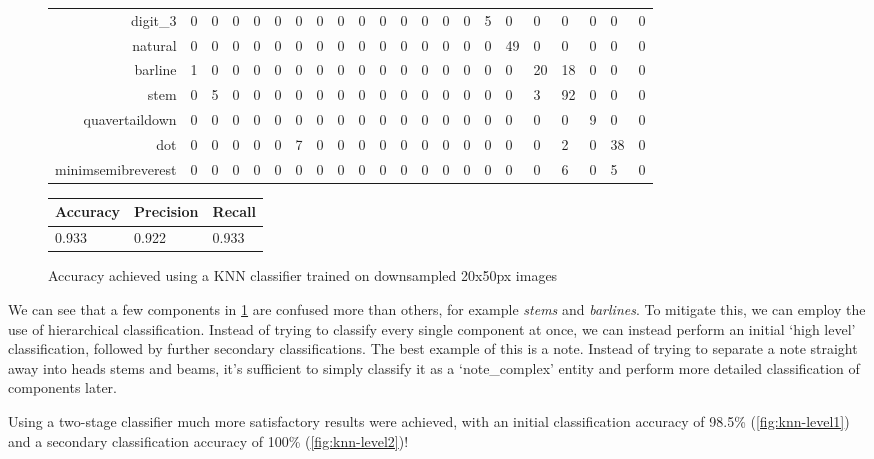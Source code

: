 \begin{figure}[H]
\begin{subtable}[b]{\linewidth}
\begin{tabularx}{\textwidth}{r|XXXXXXXXXXXXXXXXXXXXX}
    digit\_3 & 0 & 0 & 0 & 0 & 0 & 0 & 0 & 0 & 0 & 0 & 0 & 0 & 0 & 0 & 5 & 0 & 0 & 0 & 0 & 0 & 0 \\
    natural & 0 & 0 & 0 & 0 & 0 & 0 & 0 & 0 & 0 & 0 & 0 & 0 & 0 & 0 & 0 & 49 & 0 & 0 & 0 & 0 & 0 \\
    barline & 1 & 0 & 0 & 0 & 0 & 0 & 0 & 0 & 0 & 0 & 0 & 0 & 0 & 0 & 0 & 0 & 20 & 18 & 0 & 0 & 0 \\
    stem & 0 & 5 & 0 & 0 & 0 & 0 & 0 & 0 & 0 & 0 & 0 & 0 & 0 & 0 & 0 & 0 & 3 & 92 & 0 & 0 & 0 \\
    quavertaildown & 0 & 0 & 0 & 0 & 0 & 0 & 0 & 0 & 0 & 0 & 0 & 0 & 0 & 0 & 0 & 0 & 0 & 0 & 9 & 0 & 0 \\
    dot & 0 & 0 & 0 & 0 & 0 & 7 & 0 & 0 & 0 & 0 & 0 & 0 & 0 & 0 & 0 & 0 & 0 & 2 & 0 & 38 & 0 \\
    minimsemibreverest & 0 & 0 & 0 & 0 & 0 & 0 & 0 & 0 & 0 & 0 & 0 & 0 & 0 & 0 & 0 & 0 & 0 & 6 & 0 & 5 & 0 \\
    \end{tabularx}
  \end{subtable}
  \vspace{0.8cm}
  \begin{subtable}[b]{.4\linewidth}
    \begin{tabularx}{\linewidth}{lll}
      \toprule
      Accuracy & Precision & Recall \\
      \midrule
      0.933 & 0.922 & 0.933 \\
      \bottomrule
    \end{tabularx}
  \end{subtable}
  \caption{Accuracy achieved using a KNN classifier trained on downsampled 20x50px images}
  \label{table:confusion-matrix-knn-img-all}
\end{figure}

We can see that a few components in \cref{table:confusion-matrix-knn-img-all} are confused more than others, for example \emph{stems} and \emph{barlines}. To mitigate this, we can employ the use of hierarchical classification. Instead of trying to classify every single component at once, we can instead perform an initial `high level' classification, followed by further secondary classifications. The best example of this is a note. Instead of trying to separate a note straight away into heads stems and beams, it's sufficient to simply classify it as a `note\_complex' entity and perform more detailed classification of components later.

Using a two-stage classifier much more satisfactory results were achieved, with an initial classification accuracy of 98.5\% (\cref{fig:knn-level1}) and a secondary classification accuracy of 100\% (\cref{fig:knn-level2})!

